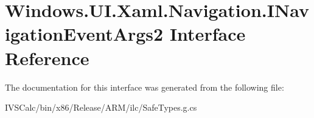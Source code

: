 \hypertarget{interface_windows_1_1_u_i_1_1_xaml_1_1_navigation_1_1_i_navigation_event_args2}{}\section{Windows.\+U\+I.\+Xaml.\+Navigation.\+I\+Navigation\+Event\+Args2 Interface Reference}
\label{interface_windows_1_1_u_i_1_1_xaml_1_1_navigation_1_1_i_navigation_event_args2}


The documentation for this interface was generated from the following file\+:\begin{DoxyCompactItemize}
\item 
I\+V\+S\+Calc/bin/x86/\+Release/\+A\+R\+M/ilc/Safe\+Types.\+g.\+cs\end{DoxyCompactItemize}
